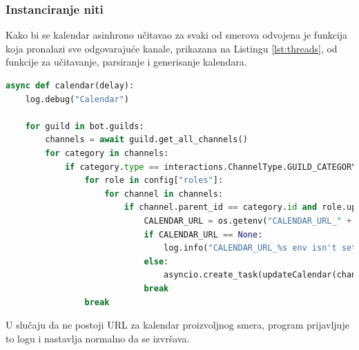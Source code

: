 \documentclass[a4paper,11pt]{article}
\begin{document}
\subsubsection{Instanciranje niti}
Kako bi se kalendar asinhrono učitavao za svaki od smerova odvojena je funkcija koja pronalazi sve odgovarajuće kanale, prikazana na Listingu \ref{lst:threads}, od funkcije za učitavanje, parsiranje i generisanje kalendara.
\begin{lstlisting}[language=Python, caption=Instanciranje niti, label=lst:threads]
async def calendar(delay):
    log.debug("Calendar")

    for guild in bot.guilds:
        channels = await guild.get_all_channels()
        for category in channels:
            if category.type == interactions.ChannelType.GUILD_CATEGORY and category.name.upper() == "calendar":
                for role in config["roles"]:
                    for channel in channels:
                        if channel.parent_id == category.id and role.upper() == channel.name.upper():
                            CALENDAR_URL = os.getenv("CALENDAR_URL_" + role)
                            if CALENDAR_URL == None:
                                log.info("CALENDAR_URL_%s env isn't set, skipping."%(role))
                            else:
                                asyncio.create_task(updateCalendar(channel, CALENDAR_URL, delay))
                            break
                break
\end{lstlisting}
U slučaju da ne postoji URL za kalendar proizvoljnog smera, program prijavljuje to logu i nastavlja normalno da se izvršava.
\newpage
\end{document}
